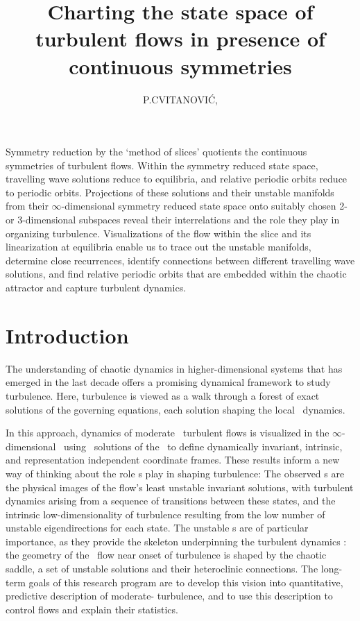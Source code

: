 \documentclass{jfm}
\title[Charting the state space of turbulent flows]
{Charting the state space of turbulent flows
 in presence of continuous symmetries}
\author[P.\ Cvitanovi{\'c}]
{
P.\ns C\ls V\ls I\ls T\ls A\ls N\ls O\ls V\ls I\ls \'C,
}
\affiliation{
 School of Physics,
 Georgia Institute of Technology,
 Atlanta, GA  30332, USA
}
\begin{document}
\maketitle

Symmetry reduction by the `method of slices'
quotients the continuous symmetries of turbulent flows. Within the
symmetry reduced state space, travelling wave solutions reduce to
equilibria, and relative periodic orbits reduce to periodic orbits.
Projections of these solutions and their unstable manifolds from their
$\infty$-dimensional symmetry reduced state space onto suitably chosen 2-
or 3-dimensional subspaces reveal their interrelations and the role they
play in organizing turbulence. Visualizations
of the flow within the slice and its linearization at equilibria enable
us to trace out the unstable manifolds, determine close recurrences,
identify connections between different travelling wave solutions, and
find relative periodic orbits that
are embedded within the chaotic attractor and capture turbulent dynamics.

\section{Introduction}
\label{s:intro}

The understanding of chaotic dynamics in higher-dimensional systems that
has emerged in the last decade offers a promising dynamical framework to
study turbulence. Here, turbulence is viewed as a walk through a forest
of exact solutions of the governing equations, each solution shaping the
local \statesp\ dynamics.

In this approach, dynamics of moderate \Reynolds\ turbulent flows is
visualized in the $\infty$-dimensional \stateDsp\  using \eqv\ solutions
of the \NSe\ to define dynamically invariant, intrinsic, and
representation independent coordinate frames.
These results inform a new way of thinking about the role {\recurrStr s}
play in shaping turbulence:
The observed {\cohStr s} are the physical images of the flow's
least unstable invariant solutions, with
turbulent dynamics arising from a sequence of transitions between
these states, and
the intrinsic low-dimensionality of turbulence resulting from the low
number of unstable eigendirections for each state.
The unstable \po s are of particular
importance, as they provide the skeleton underpinning the
turbulent dynamics \citep{DasBuch}: the geometry of the \statesp\ flow
near onset of turbulence is shaped by the chaotic saddle, a set of
unstable solutions and their heteroclinic connections.
The long-term goals of this research program are to develop this vision
into quantitative,  predictive description of moderate-{\Reynolds}
turbulence, and to use this description to control flows and explain their statistics.
\end{document}
